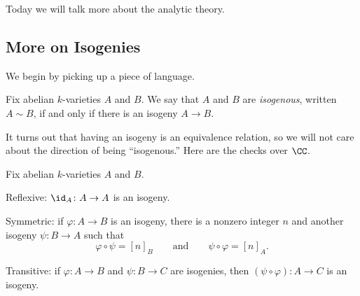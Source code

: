 \documentclass[../notes.tex]{subfiles}
\begin{document}
Today we will talk more about the analytic theory.

\subsection{More on Isogenies}
We begin by picking up a piece of language.
\begin{definition}[isogenous]
	Fix abelian $k$-varieties $A$ and $B$. We say that $A$ and $B$ are \textit{isogenous}, written $A\sim B$, if and only if there is an isogeny $A\to B$.
\end{definition}
It turns out that having an isogeny is an equivalence relation, so we will not care about the direction of being ``isogenous.'' Here are the checks over $\CC$.
\begin{lemma} \label{lem:isog-equiv}
	Fix abelian $k$-varieties $A$ and $B$.
	\begin{listalph}
		\item Reflexive: $\id_A\colon A\to A$ is an isogeny.
		\item Symmetric: if $\varphi\colon A\to B$ is an isogeny, there is a nonzero integer $n$ and another isogeny $\psi\colon B\to A$ such that
		\[\varphi\circ\psi=[n]_B\qquad\text{and}\qquad\psi\circ\varphi=[n]_A.\]
		\item Transitive: if $\varphi\colon A\to B$ and $\psi\colon B\to C$ are isogenies, then $(\psi\circ\varphi)\colon A\to C$ is an isogeny. 
	\end{listalph}
\end{lemma}
\end{document}
